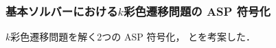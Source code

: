 \documentclass[dvipdfmx,11pt]{beamer}
\begin{document}
\begin{frame}\frametitle{基本ソルバーにおける$k$彩色遷移問題の ASP 符号化}

  $k$彩色遷移問題を解く2つの ASP 符号化，
  とを考案した．

  \begin{exampleblock}{}
    \centering
    
  \end{exampleblock}


\end{frame}
\end{document}
